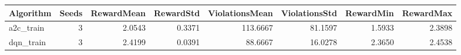 \begin{tabular}{lrrrrrrr}
\toprule
Algorithm & Seeds & RewardMean & RewardStd & ViolationsMean & ViolationsStd & RewardMin & RewardMax \\
\midrule
a2c_train & 3 & 2.0543 & 0.3371 & 113.6667 & 81.1597 & 1.5933 & 2.3898 \\
dqn_train & 3 & 2.4199 & 0.0391 & 88.6667 & 16.0278 & 2.3650 & 2.4538 \\
\bottomrule
\end{tabular}
